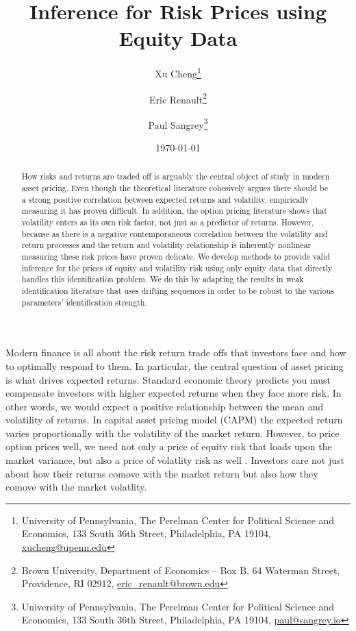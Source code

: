 \documentclass[11pt, letterpaper, twoside, final]{article}
\author{Xu Cheng\thanks{University of Pennsylvania, The Perelman Center for Political Science and
    Economics, 133 South 36th Street, Philadelphia, PA 19104, \href{mailto:xucheng@upenn.edu}{xucheng@upenn.edu}}
    \and 
    Eric Renault\thanks{Brown University, Department of Economics -- Box B, 64 Waterman Street, Providence, RI
    02912, \href{mailto:eric_renault@brown.edu}{eric\_renault@brown.edu}}
    \and 
    Paul Sangrey\thanks{University of Pennsylvania, The Perelman Center for Political Science and
    Economics, 133 South 36th Street, Philadelphia, PA 19104, \href{mailto:paul@sangrey.io}{paul@sangrey.io}}}
\title{Inference for Risk Prices using Equity Data}
\date{\today}
\begin{document}
\begin{titlepage}


    \maketitle
    \thispagestyle{empty}
    \addtocounter{page}{-1}

    \begin{abstract} \singlespacing \noindent 
        How risks and returns are traded off is arguably the central object of study in modern asset pricing. 
        Even though the theoretical literature cohesively argues there should be a strong positive correlation
        between expected returns and volatility, empirically measuring it has proven difficult. 
        In addition, the option pricing literature shows that volatility enters as its own risk factor, not just
        as a predictor of returns.
        However, because as there is a negative contemporaneous correlation between the volatility and return
        processes and the return and volatility relationship is inherently nonlinear measuring these risk prices
        have proven delicate. 
        We develop methods to provide  valid inference for the prices of equity and volatility risk using only
        equity data that directly handles this identification problem. 
        We do this by adapting the results in weak identification literature that uses drifting sequences in order
        to be robust to the various parameters' identification strength. 
    \end{abstract}



\end{titlepage}

\tableofcontents
\clearpage

{}

Modern finance is all about the risk return trade offs that investors face and how to optimally respond to them. 
In particular, the central question of asset pricing is what drives expected returns.
Standard economic theory predicts you must compensate investors with higher expected returns when they face more
risk.
In other words, we would expect a positive relationship between the mean and volatility of returns.
In  capital asset pricing model (CAPM) the expected
return varies proportionally with the volatility of the market return.
However, to price option prices well, we need not only a price of equity risk that loads upon the market variance,
but also a price of volatlity risk as well \parencite{christoffersen2013capturing}.
Investors care not just about how their returns comove with the market return but also how they comove with the
market volatlity.
\end{document}
